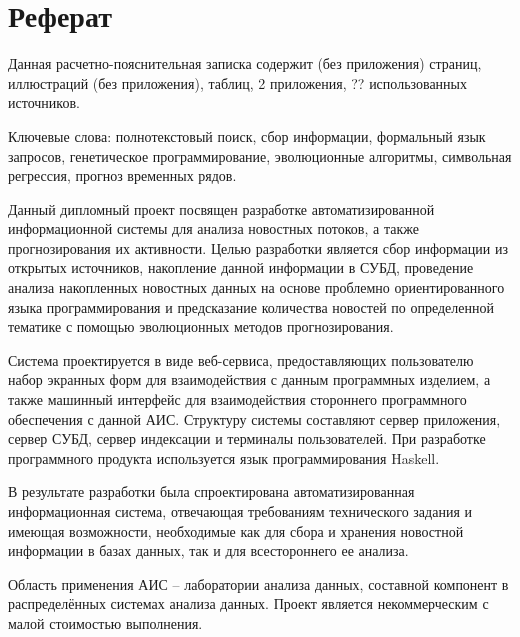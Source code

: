 \section*{Реферат}

Данная расчетно-пояснительная записка содержит \pageref{LastPage} (без приложения) страниц,  иллюстраций (без приложения),  таблиц, 2 приложения, ?? использованных источников.

Ключевые слова: полнотекстовый поиск, сбор информации, формальный язык запросов, генетическое программирование, эволюционные алгоритмы, символьная регрессия, прогноз временных рядов.

Данный дипломный проект посвящен разработке автоматизированной информационной системы для анализа новостных потоков, а также прогнозирования их активности. Целью разработки является сбор информации из открытых источников, накопление данной информации в СУБД, проведение анализа накопленных новостных данных на основе проблемно ориентированного языка программирования и предсказание количества новостей по определенной тематике с помощью эволюционных методов прогнозирования.

Система проектируется в виде веб-сервиса, предоставляющих пользователю набор экранных форм для взаимодействия с данным программных изделием, а также машинный интерфейс для взаимодействия стороннего программного обеспечения с данной АИС. Структуру системы составляют сервер приложения, сервер СУБД, сервер индексации и терминалы пользователей. При разработке программного продукта используется язык программирования Haskell.

В результате разработки была спроектирована автоматизированная информационная система, отвечающая требованиям технического задания и имеющая возможности, необходимые как для сбора и хранения новостной информации в базах данных, так и для всестороннего ее анализа.

Область применения АИС -- лаборатории анализа данных, составной компонент в распределённых системах анализа данных. Проект является некоммерческим с малой стоимостью выполнения.